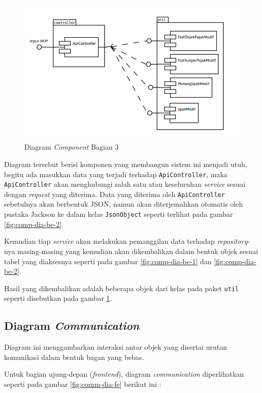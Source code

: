 \documentclass[pdftex,12pt, oneside]{article}
\begin{document}
\begin{figure}[H]
	\centering
	\includegraphics[width=1\textwidth]{./resources/comp-dia-backend-3}
	\caption{Diagram \textit{Component} Bagian 3}
	\label{fig:comp-dia-be-3}
\end{figure}

Diagram tersebut berisi komponen yang membangun sistem ini menjadi utuh, begitu ada masukkan data yang terjadi terhadap \texttt{ApiController}, maka \texttt{ApiController} akan menghubungi salah satu atau keseluruhan \textit{service} sesuai dengan \textit{request} yang diterima. Data yang diterima oleh \texttt{ApiController} sebetulnya akan berbentuk JSON, namun akan diterjemahkan otomatis oleh pustaka Jackson ke dalam kelas \texttt{JsonObject} seperti terlihat pada gambar \ref{fig:comp-dia-be-2}.

Kemudian tiap \textit{service} akan melakukan pemanggilan data terhadap \textit{repository}-nya masing-masing yang kemudian akan dikembalikan dalam bentuk objek sesuai tabel yang diaksesnya seperti pada gambar \ref{fig:comp-dia-be-1} dan \ref{fig:comp-dia-be-2}.

Hasil yang dikembalikan adalah beberapa objek dari kelas pada paket \texttt{util} seperti disebutkan pada gambar \ref{fig:comp-dia-be-3}.

\subsection{Diagram \textit{Communication}}

Diagram ini menggambarkan interaksi antar objek yang disertai urutan komunikasi dalam bentuk bagan yang bebas. 

Untuk bagian ujung-depan (\textit{frontend}), diagram \textit{communication} diperlihatkan seperti pada gambar \ref{fig:comm-dia-fe} berikut ini :
\end{document}
